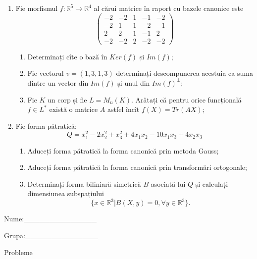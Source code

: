 \documentclass{article}
\begin{document}
\begin{enumerate}
 \item Fie morfismul $f:\mathbb{R}^5 \to \mathbb{R}^4$ al cărui matrice în raport cu bazele canonice este
$$\begin{pmatrix}
-2&-2&1&-1&-2\\
-2&1&1&-2&-1\\
2&2&1&-1&2\\
-2&-2&2&-2&-2
\end{pmatrix}$$

\begin{enumerate}
\item Determinați cîte o bază în $Ker(f)$ și $Im(f)$;
\item Fie vectorul $v=(1,3,1,3)$ determinați descompunerea acestuia ca suma dintre un vector din $Im(f)$ și unul din $Im(f)^\perp$;
\item Fie $K$ un corp și fie $L=M_n(K)$. Arătați că pentru orice funcțională $f \in L^*$ există o matrice $A$ astfel încît $f(X)=Tr(AX)$;
\end{enumerate}
\item Fie forma pătratică:
$$Q= x_1^2-2x_2^2+x_3^2+4x_1x_2-10x_1x_3+4x_2x_3$$

\begin{enumerate}
\item Aduceți forma pătratică la forma canonică prin metoda Gauss;
\item Aduceți forma pătratică la forma canonică prin transformări ortogonale;
\item Determinați forma biliniară simetrică $B$ asociată lui $Q$ și calculați dimensiunea subspațiului
$$\{x \in \mathbb{R}^3 | B(X,y)=0,\forall y \in \mathbb{R}^3\}.$$

\end{enumerate}
\end{enumerate}
\newpage
\begin{flushright}
Nume:\_\_\_\_\_\_\_\_\_\_\_\_\_\_
 
 
Grupa:\_\_\_\_\_\_\_\_\_\_\_\_\_\_
\end{flushright}
\begin{center}
\vspace{2cm}
{\Large Probleme}
\vspace{2cm}
\end{center}
\end{document}
